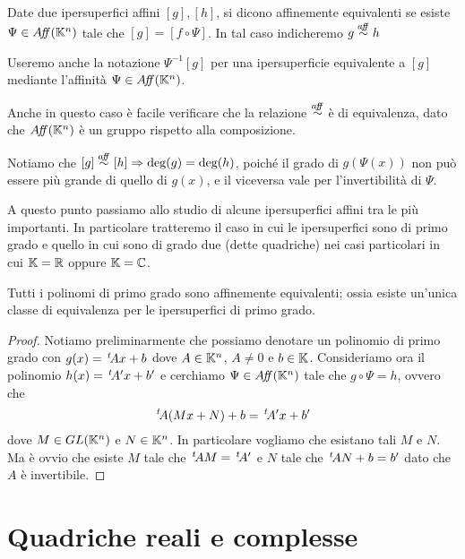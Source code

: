 \begin{definition}
	Date due ipersuperfici affini $[g],[h]$, si dicono affinemente equivalenti se esiste $\Psi\in A\!f\!\!f(\mathbb K^n)$ tale che $[g]=[f\circ\Psi]$.
	In tal caso indicheremo $g\stackrel{a\!f\!\!f}{\sim} h$
\end{definition}
\begin{remark}
	Useremo anche la notazione $\Psi^{-1}[g]$ per una ipersuperficie equivalente a $[g]$ mediante l'affinità $\Psi \in A\!f\!\!f(\mathbb K^n)$.
\end{remark}
\begin{remark}
	Anche in questo caso è facile verificare che la relazione $\stackrel{a\!f\!\!f}{\sim}$ è di equivalenza, dato che $A\!f\!\!f(\mathbb K^n)$ è un gruppo rispetto alla
	composizione.
\end{remark}
\begin{remark}
	Notiamo che $[g]\stackrel{a\!f\!\!f}{\sim} [h]\Rightarrow \text{deg}(g)=\text{deg}(h)$,
	poiché il grado di $g(\Psi(x))$ non può essere più grande di quello di $g(x)$, e il viceversa vale per l'invertibilità di $\Psi$.
\end{remark}

A questo punto passiamo allo studio di alcune ipersuperfici affini tra le più importanti. In particolare tratteremo il caso in cui le 
ipersuperfici sono di primo grado e quello in cui sono di grado due (dette quadriche) nei casi particolari in cui $\mathbb K=\mathbb R$ oppure $\mathbb K=\mathbb C$.

\begin{proposition}[Grado $1$]
	Tutti i polinomi di primo grado sono affinemente equivalenti;
	ossia esiste un'unica classe di equivalenza per le ipersuperfici di primo grado.
\end{proposition}

\begin{proof}
	Notiamo preliminarmente che possiamo denotare un polinomio di primo grado con $g(x)=\, ^{t}\!Ax+b$ dove $A\in \mathbb K^n$, $A\neq 0$ e $b\in \mathbb K$.
	Consideriamo ora il polinomio $h(x)=\, ^{t}\!A'x+b'$ e cerchiamo $\Psi\in A\!f\!\!f(\mathbb K^n)$ tale che $g\circ \Psi = h$, ovvero che
	\[
		\, ^{t}\!A(Mx+N)+b=\, ^{t}\!A'x+b'
	\]
	dove $M\in GL(\mathbb K^n)$ e $N\in \mathbb K^n$. In particolare vogliamo che esistano tali $M$ e $N$.
	Ma è ovvio che esiste $M$ tale che $\, ^{t}\!AM=\, ^{t}\!A'$ e $N$ tale che $\, ^{t}\!AN+b=b'$ dato che $A$ è invertibile.
\end{proof}


\section{Quadriche reali e complesse}

